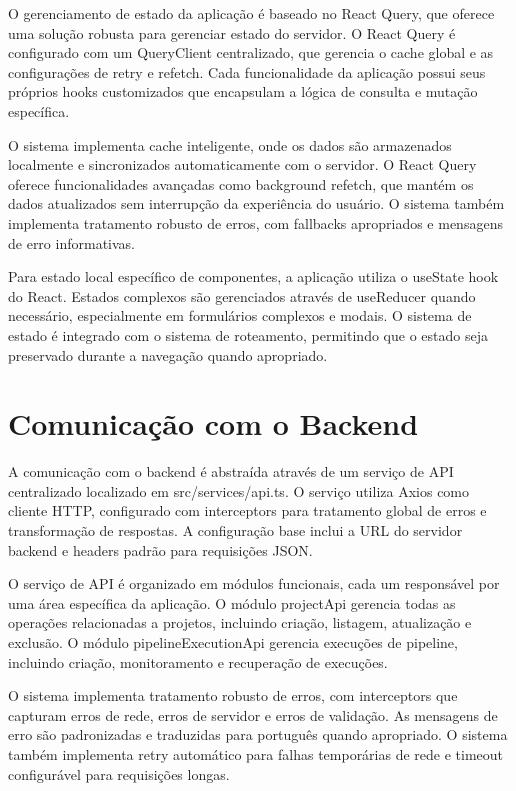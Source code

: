 \documentclass[12pt,a4paper]{article}
\begin{document}
O gerenciamento de estado da aplicação é baseado no React Query, que oferece uma solução robusta para gerenciar estado do servidor. O React Query é configurado com um QueryClient centralizado, que gerencia o cache global e as configurações de retry e refetch. Cada funcionalidade da aplicação possui seus próprios hooks customizados que encapsulam a lógica de consulta e mutação específica.

O sistema implementa cache inteligente, onde os dados são armazenados localmente e sincronizados automaticamente com o servidor. O React Query oferece funcionalidades avançadas como background refetch, que mantém os dados atualizados sem interrupção da experiência do usuário. O sistema também implementa tratamento robusto de erros, com fallbacks apropriados e mensagens de erro informativas.

Para estado local específico de componentes, a aplicação utiliza o useState hook do React. Estados complexos são gerenciados através de useReducer quando necessário, especialmente em formulários complexos e modais. O sistema de estado é integrado com o sistema de roteamento, permitindo que o estado seja preservado durante a navegação quando apropriado.

\section{Comunicação com o Backend}

A comunicação com o backend é abstraída através de um serviço de API centralizado localizado em src/services/api.ts. O serviço utiliza Axios como cliente HTTP, configurado com interceptors para tratamento global de erros e transformação de respostas. A configuração base inclui a URL do servidor backend e headers padrão para requisições JSON.

O serviço de API é organizado em módulos funcionais, cada um responsável por uma área específica da aplicação. O módulo projectApi gerencia todas as operações relacionadas a projetos, incluindo criação, listagem, atualização e exclusão. O módulo pipelineExecutionApi gerencia execuções de pipeline, incluindo criação, monitoramento e recuperação de execuções.

O sistema implementa tratamento robusto de erros, com interceptors que capturam erros de rede, erros de servidor e erros de validação. As mensagens de erro são padronizadas e traduzidas para português quando apropriado. O sistema também implementa retry automático para falhas temporárias de rede e timeout configurável para requisições longas.
\end{document}
